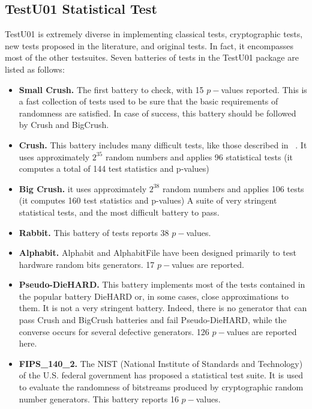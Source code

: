 \subsection{TestU01 Statistical Test}
\label{Testing a generator}

TestU01 is extremely diverse in implementing classical tests,
cryptographic tests, new tests proposed in the literature, and original tests.
In fact, it encompasses most of the other testsuites. 
Seven batteries of tests in the TestU01 package are listed as follows:

\begin{itemize}
\item{\textbf{Small Crush.}} The first battery to check, with 15 $p-$values reported. This is a fast collection of tests used to be sure that the basic requirements of randomness are satisfied. In case of success, this battery should be followed by Crush and BigCrush.
\item{\textbf{Crush.}} This battery includes many difficult tests, like those described in ~\cite{Knuth1998}. %
It uses approximately $2^35$ random numbers and applies 96 statistical tests
(it computes a total of 144 test statistics and p-values)
\item{\textbf{Big Crush.}} it uses
approximately $2^38$ random numbers and applies 106 tests (it computes 160 test
statistics and p-values)
A suite of very stringent statistical tests, and the most difficult battery to pass.
\item{\textbf{Rabbit.}} This battery of tests reports 38 $p-$values.
\item{\textbf{Alphabit.}} Alphabit and AlphabitFile have been designed primarily to test hardware random bits generators. 17 $p-$values are reported.
\item{\textbf{Pseudo-DieHARD.}} This battery implements most of the tests contained in the popular battery DieHARD or, in some cases, close approximations to them. It is not a very stringent battery. Indeed, there is no generator that can pass Crush and BigCrush batteries and fail Pseudo-DieHARD, while the converse occurs for several defective generators. 126 $p-$values are reported here.
\item{\textbf{FIPS\_140\_2.}} The NIST (National Institute of Standards and Technology) of the U.S. federal government has proposed a statistical test suite. It is used to evaluate the randomness of bitstreams produced by cryptographic random number generators. This battery reports 16 $p-$values.
\end{itemize}

